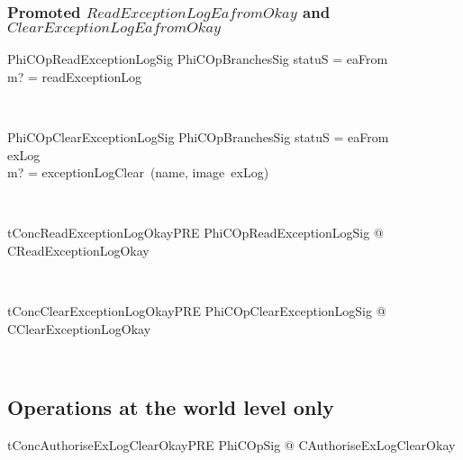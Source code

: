 \subsubsection{Promoted $ReadExceptionLogEafromOkay$ and $ClearExceptionLogEafromOkay$}

\begin{LNewSDef}
\begin{schema}{PhiCOpReadExceptionLogSig}
    PhiCOpBranchesSig
\where
    statuS = eaFrom \\
    m? = readExceptionLog
\end{schema}~\end{LNewSDef}

\begin{LNewSDef}
\begin{schema}{PhiCOpClearExceptionLogSig}
    PhiCOpBranchesSig
\where
    statuS = eaFrom \\
    exLog \neq \emptyset \\
    m? = exceptionLogClear~(name, image~exLog)
\end{schema}~\end{LNewSDef}

\begin{LNewThm}
\begin{theorem}{tConcReadExceptionLogOkayPRE}
   \forall PhiCOpReadExceptionLogSig @ \pre CReadExceptionLogOkay
\end{theorem}~\end{LNewThm}

\begin{LNewThm}
\begin{theorem}{tConcClearExceptionLogOkayPRE}
   \forall PhiCOpClearExceptionLogSig  @ \pre CClearExceptionLogOkay
\end{theorem}~\end{LNewThm}

\subsection{Operations at the world level only}\label{ch8.specproof-conc.worldlevelalone}

\begin{LNewThm}
\begin{theorem}{tConcAuthoriseExLogClearOkayPRE}
   \forall PhiCOpSig @ \pre CAuthoriseExLogClearOkay
\end{theorem}~\end{LNewThm}

